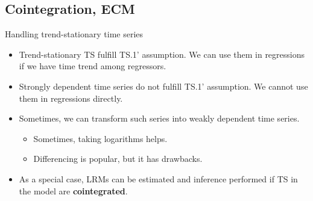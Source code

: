 \documentclass{beamer}
\begin{document}
\subsection{Cointegration, ECM}
\begin{frame}{Handling trend-stationary time series}
\begin{itemize}
\item Trend-stationary TS fulfill TS.1' assumption. We can use them in regressions if we have time trend among regressors.
\medskip
\item Strongly dependent time series do not fulfill TS.1' assumption. We cannot use them in regressions directly.
\medskip
\item Sometimes, we can transform such series into weakly dependent time series.\\ \medskip
\begin{itemize}
    \item Sometimes, taking logarithms helps.
    \medskip
\item Differencing is popular, but it has drawbacks.
\end{itemize}
\item As a special case, LRMs can be estimated and inference performed if TS in the model are \textbf{cointegrated}.
\end{itemize}
\end{frame}
\end{document}

